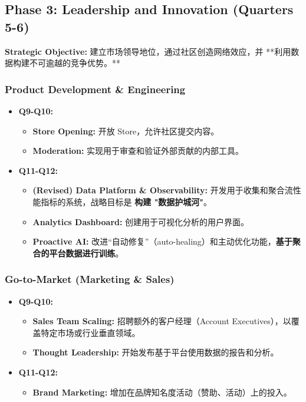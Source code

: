 \documentclass[11pt, a4paper, oneside]{article}
\begin{document}
\clearpage

\subsection{Phase 3: Leadership and Innovation (Quarters 5-6)}
\textbf{Strategic Objective:} 建立市场领导地位，通过社区创造网络效应，并 **利用数据构建不可逾越的竞争优势。**

\subsubsection{Product Development \& Engineering}
\begin{itemize}[leftmargin=*]
    \item \textbf{Q9-Q10:}
    \begin{itemize}
        \item \textbf{Store Opening:} 开放 Store，允许社区提交内容。
        \item \textbf{Moderation:} 实现用于审查和验证外部贡献的内部工具。
    \end{itemize}
    \item \textbf{Q11-Q12:}
    \begin{itemize}
        \item \textbf{(Revised) Data Platform \& Observability:} 开发用于收集和聚合流性能指标的系统，战略目标是 \textbf{构建 "数据护城河"}。
        \item \textbf{Analytics Dashboard:} 创建用于可视化分析的用户界面。
        \item \textbf{Proactive AI:} 改进“自动修复”（auto-healing）和主动优化功能，\textbf{基于聚合的平台数据进行训练}。
    \end{itemize}
\end{itemize}

\subsubsection{Go-to-Market (Marketing \& Sales)}
\begin{itemize}[leftmargin=*]
    \item \textbf{Q9-Q10:}
    \begin{itemize}
        \item \textbf{Sales Team Scaling:} 招聘额外的客户经理（Account Executives），以覆盖特定市场或行业垂直领域。
        \item \textbf{Thought Leadership:} 开始发布基于平台使用数据的报告和分析。
    \end{itemize}
    \item \textbf{Q11-Q12:}
    \begin{itemize}
        \item \textbf{Brand Marketing:} 增加在品牌知名度活动（赞助、活动）上的投入。
    \end{itemize}
\end{itemize}
\end{document}
